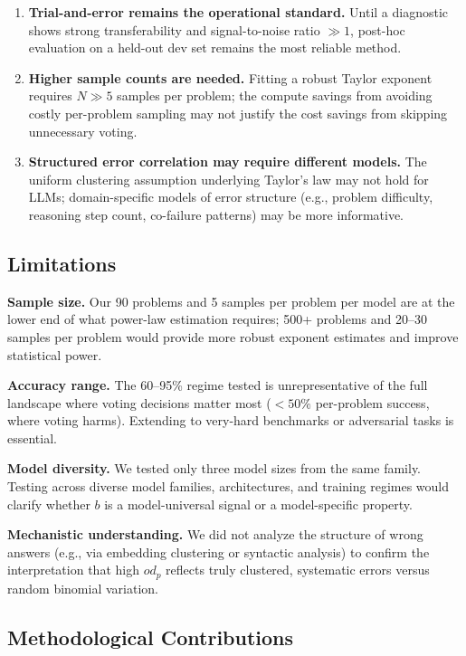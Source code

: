 \documentclass[11pt,letterpaper]{article}
\begin{document}
\begin{enumerate}
  \item \textbf{Trial-and-error remains the operational standard.} Until a diagnostic shows strong transferability and signal-to-noise ratio $\gg 1$, post-hoc evaluation on a held-out dev set remains the most reliable method.
  \item \textbf{Higher sample counts are needed.} Fitting a robust Taylor exponent requires $N \gg 5$ samples per problem; the compute savings from avoiding costly per-problem sampling may not justify the cost savings from skipping unnecessary voting.
  \item \textbf{Structured error correlation may require different models.} The uniform clustering assumption underlying Taylor's law may not hold for LLMs; domain-specific models of error structure (e.g., problem difficulty, reasoning step count, co-failure patterns) may be more informative.
\end{enumerate}

\subsection{Limitations}

\textbf{Sample size.} Our 90 problems and 5 samples per problem per model are at the lower end of what power-law estimation requires; 500+ problems and 20--30 samples per problem would provide more robust exponent estimates and improve statistical power.

\textbf{Accuracy range.} The 60--95\% regime tested is unrepresentative of the full landscape where voting decisions matter most ($< 50\%$ per-problem success, where voting harms). Extending to very-hard benchmarks or adversarial tasks is essential.

\textbf{Model diversity.} We tested only three model sizes from the same family. Testing across diverse model families, architectures, and training regimes would clarify whether $b$ is a model-universal signal or a model-specific property.

\textbf{Mechanistic understanding.} We did not analyze the structure of wrong answers (e.g., via embedding clustering or syntactic analysis) to confirm the interpretation that high $od_p$ reflects truly clustered, systematic errors versus random binomial variation.

\subsection{Methodological Contributions}
\end{document}

